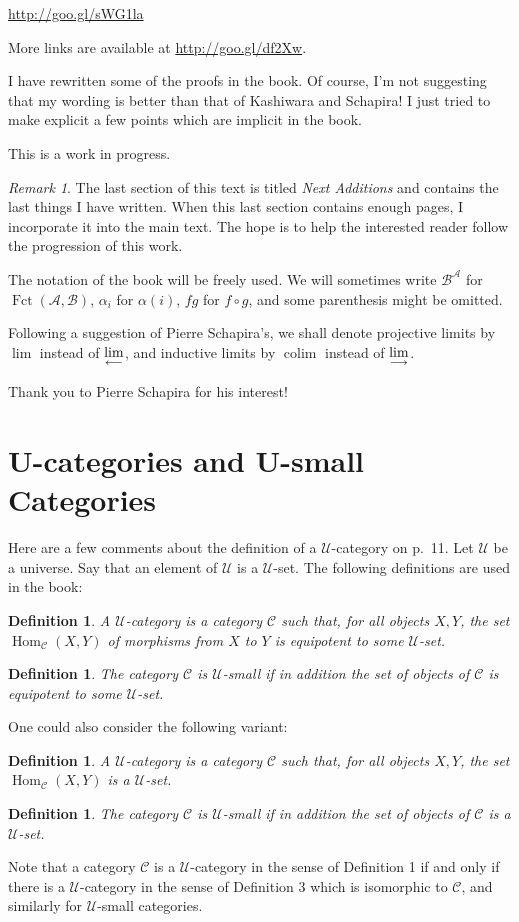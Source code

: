 \documentclass[12pt]{article}
\newtheorem{df}[thm]{Definition}%
\theoremstyle{remark}
\newtheorem{rk}[thm]{Remark}
\theoremstyle{definition}
\newcommand{\n}{\noindent}
\newcommand{\A}{\mathcal A}
\newcommand{\B}{\mathcal B}
\newcommand{\C}{\mathcal C}
\newcommand{\U}{\mathcal U}
\newcommand{\ilim}{\operatornamewithlimits{\underset{\longrightarrow}{lim}}}
\newcommand{\plim}{\operatornamewithlimits{\underset{\longleftarrow}{lim}}}
\DeclareMathOperator*{\coli}{colim}
\DeclareMathOperator{\Fct}{Fct}
\DeclareMathOperator{\Hom}{Hom}
\begin{document}
\n\href{http://goo.gl/sWG1la}{http://goo.gl/sWG1la}

More links are available at \href{http://goo.gl/df2Xw}{http://goo.gl/df2Xw}.

I have rewritten some of the proofs in the book. Of course, I'm not suggesting that my wording is better than that of Kashiwara and Schapira! I just tried to make explicit a few points which are implicit in the book. 

This is a work in progress. %
%
\begin{rk}\label{next}
The last section of this text is titled {\em Next Additions} and contains the last things I have written. When this last section contains enough pages, %
I incorporate it into the main text. The hope is to help the interested reader follow the progression of this work.
\end{rk}
%
The notation of the book will be freely used. We will sometimes write $\B^\A$ for $\Fct(\A,\B)$, $\alpha_i$ for $\alpha(i)$, $fg$ for $f\circ g$, and some parenthesis might be omitted. 

Following a suggestion of Pierre Schapira's, we shall denote projective limits by $\lim$ instead of $\plim$, and inductive limits by $\coli$ instead of $\ilim$. 

Thank you to Pierre Schapira for his interest!%
%
\section{U-categories and U-small Categories}\label{ucat}
% 
Here are a few comments about the definition of a $\U$-category on p.~11. Let $\U$ be a universe. Say that an element of $\U$ is a $\U$-set. The following definitions are used in the book: 
%
\begin{df} 
A $\U$-category is a category $\C$ such that, for all objects $X,Y$, the set $\Hom_\C(X,Y)$ of morphisms from $X$ to $Y$ is equipotent to some $\U$-set. 
\end{df} 
% 
\begin{df}
The category $\C$ is $\U$-small if in addition the set of objects of $\C$ is equipotent to some $\U$-set. 
\end{df} 
% 
One could also consider the following variant: 
% 
\begin{df}\label{ducat}
A $\U$-category is a category $\C$ such that, for all objects $X,Y$, the set $\Hom_\C(X,Y)$ is a $\U$-set. 
\end{df} 
% 
\begin{df}\label{small}
The category $\C$ is $\U$-small if in addition the set of objects of $\C$ is a $\U$-set. 
\end{df} 
% 
Note that a category $\C$ is a $\U$-category in the sense of Definition 1 if and only if there is a $\U$-category in the sense of Definition 3 which is isomorphic to $\C$, and similarly for $\U$-small categories.\bigskip
\end{document}
